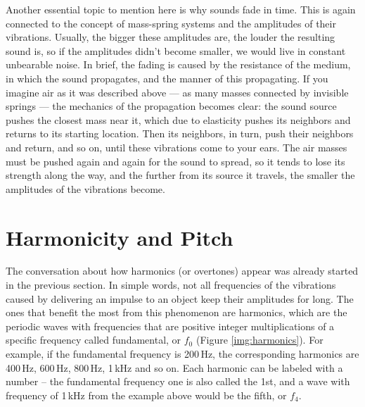 
Another essential topic to mention here is why sounds fade in time. This is again connected to the concept of mass-spring systems and the amplitudes of their vibrations. Usually, the bigger these amplitudes are, the louder the resulting sound is, so if the amplitudes didn’t become smaller, we would live in constant unbearable noise. In brief, the fading is caused by the resistance of the medium, in which the sound propagates, and the manner of this propagating. If you imagine air as it was described above --- as many masses connected by invisible springs --- the mechanics of the propagation becomes clear: the sound source pushes the closest mass near it, which due to elasticity pushes its neighbors and returns to its starting location. Then its neighbors, in turn, push their neighbors and return, and so on, until these vibrations come to your ears. The air masses must be pushed again and again for the sound to spread, so it tends to lose its strength along the way, and the further from its source it travels, the smaller the amplitudes of the vibrations become.

\section{Harmonicity and Pitch}

The conversation about how harmonics (or overtones) appear was already started in the previous section. In simple words, not all frequencies of the vibrations caused by delivering an impulse to an object keep their amplitudes for long. The ones that benefit the most from this phenomenon are harmonics, which are the periodic waves with frequencies that are positive integer multiplications of a specific frequency called fundamental, or $f_0$ (Figure \ref{img:harmonics}). For example, if the fundamental frequency is 200\,Hz, the corresponding harmonics are 400\,Hz, 600\,Hz, 800\,Hz, 1\,kHz and so on. Each harmonic can be labeled with a number -- the fundamental frequency one is also called the 1st, and a wave with frequency of 1\,kHz from the example above would be the fifth, or $f_4$.\\

